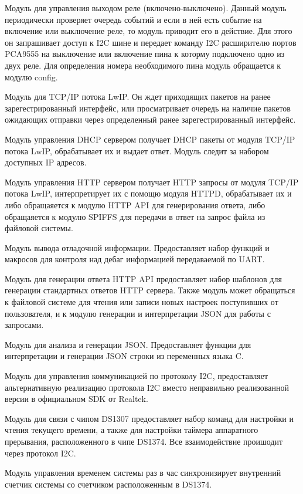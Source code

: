 Модуль для управления выходом реле (включено-выключено).
Данный модуль периодически проверяет очередь событий и если в ней есть событие на включение или выключение реле, то модуль приводит его в действие. Для этого он запрашивает доступ к I2C шине и передает команду I2C расширителю портов PCA9555 на выключение или включение пина к которму подключено одно из двух реле. Для определения номера необходимого пина модуль обращается к модулю config. 

Модуль для TCP/IP потока LwIP. Он ждет приходящих пакетов на ранее зарегестрированный интерфейс, или просматривает очередь на наличие пакетов ожидающих отправки через определенный ранее зарегестрированный интерфейс.

Модуль управления DHCP сервером получает DHCP пакеты от модуля TCP/IP потока LwIP, обрабатывает их и выдает ответ. Модуль следит за набором доступных IP адресов.

Модуль управления HTTP сервером получает HTTP запросы от модуля TCP/IP потока LwIP, интерпретирует их с помощю модуля HTTPD, обрабатывает их и либо обращаяется к модулю HTTP API для генерирования ответа, либо обращаяется к модулю SPIFFS для передачи в ответ на запрос файла из файловой системы. 

Модуль вывода отладочной информации.
Предоставляет набор функций и макросов для контроля над дебаг информацией передаваемой по UART.

Модуль для генерации ответа HTTP API предоставляет набор шаблонов для генерации стандартных ответов HTTP сервера. Также модуль может обращаться к файловой системе для чтения или записи новых настроек поступивших от пользователя, и к модулю генерации и интерпретации JSON для работы с запросами.

Модуль для анализа и генерации JSON.
Предоставляет функции для интерпретации и генерации JSON строки из переменных языка C.

Модуль для управления коммуникацией по протоколу I2C, предоставляет альтернативную реализацию протокола I2C вместо неправильно реализованной версии в официальном SDK от Realtek.

Модуль для связи с чипом DS1307 предоставляет набор команд для настройки и чтения текущего времени, а также для настройки таймера аппаратного прерывания, расположенного в чипе DS1374. Все взаимодействие проишодит через протокол I2C.

Модуль управления временем системы раз в час синхронизирует внутренний счетчик системы со счетчиком расположенным в DS1374.

